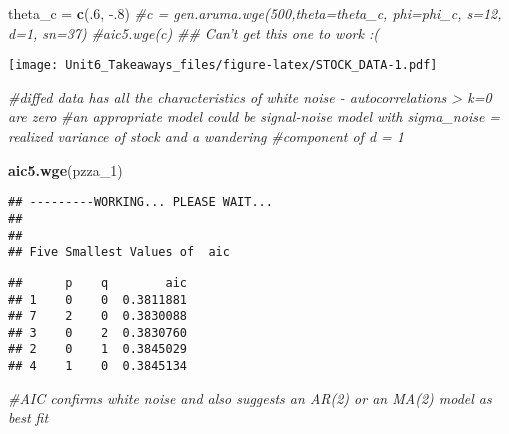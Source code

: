 \documentclass[
]{article}
\newenvironment{Shaded}{\begin{snugshade}}{\end{snugshade}}
\newcommand{\CommentTok}[1]{\textcolor[rgb]{0.56,0.35,0.01}{\textit{#1}}}
\newcommand{\DataTypeTok}[1]{\textcolor[rgb]{0.13,0.29,0.53}{#1}}
\newcommand{\DecValTok}[1]{\textcolor[rgb]{0.00,0.00,0.81}{#1}}
\newcommand{\FloatTok}[1]{\textcolor[rgb]{0.00,0.00,0.81}{#1}}
\newcommand{\KeywordTok}[1]{\textcolor[rgb]{0.13,0.29,0.53}{\textbf{#1}}}
\newcommand{\NormalTok}[1]{#1}
\newcommand{\OperatorTok}[1]{\textcolor[rgb]{0.81,0.36,0.00}{\textbf{#1}}}
\newcommand{\OtherTok}[1]{\textcolor[rgb]{0.56,0.35,0.01}{#1}}
\newcommand{\StringTok}[1]{\textcolor[rgb]{0.31,0.60,0.02}{#1}}
\begin{document}
\begin{Shaded}
\begin{Highlighting}[]
\NormalTok{theta_c =}\StringTok{ }\KeywordTok{c}\NormalTok{(.}\DecValTok{6}\NormalTok{, }\FloatTok{-.8}\NormalTok{)}
\CommentTok{#c = gen.aruma.wge(500,theta=theta_c, phi=phi_c, s=12, d=1,  sn=37)}
\CommentTok{#aic5.wge(c)}
\CommentTok{## Can't get this one to work :(}
\end{Highlighting}
\end{Shaded}

\begin{Shaded}
\end{Shaded}

\texttt{[image: Unit6\_Takeaways\_files/figure-latex/STOCK\_DATA-1.pdf]}

\begin{Shaded}
\begin{Highlighting}[]
\CommentTok{#diffed data has all the characteristics of white noise - autocorrelations > k=0 are zero}
\CommentTok{#an appropriate model could be signal-noise model with sigma_noise = realized variance of stock and a wandering }
\CommentTok{#component of d = 1}

\KeywordTok{aic5.wge}\NormalTok{(pzza_}\DecValTok{1}\NormalTok{)}
\end{Highlighting}
\end{Shaded}

\begin{verbatim}
## ---------WORKING... PLEASE WAIT... 
## 
## 
## Five Smallest Values of  aic
\end{verbatim}

\begin{verbatim}
##      p    q        aic
## 1    0    0  0.3811881
## 7    2    0  0.3830088
## 3    0    2  0.3830760
## 2    0    1  0.3845029
## 4    1    0  0.3845134
\end{verbatim}

\begin{Shaded}
\begin{Highlighting}[]
\CommentTok{#AIC confirms white noise and also suggests an AR(2) or an MA(2) model as best fit}
\end{Highlighting}
\end{Shaded}
\end{document}
